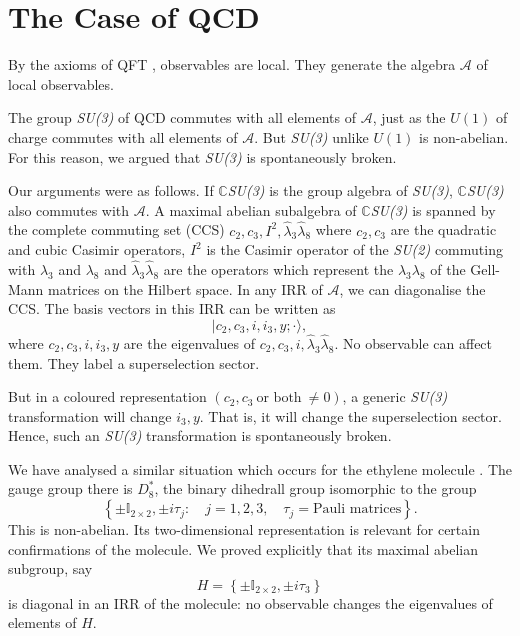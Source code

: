 \section{The Case of QCD}\label{chap4-sec3}

By the axioms of QFT \cite{chap4-key9}, observables are local. They generate the algebra $\mathcal{A}$ of local observables.

The group \textit{SU(3)} of QCD commutes with all elements of $\mathcal{A}$, just as the $U(1)$ of charge commutes with all elements of  $\mathcal{A}$. But \textit{SU(3)} unlike $U(1)$ is non-abelian. For this reason, we argued \cite{chap4-key1, chap4-key4} that \textit{SU(3)} is spontaneously broken.

Our arguments were as follows. If $\mathbb{C}$\textit{SU(3)} is the group algebra of \textit{SU(3)}, $\mathbb{C}$\textit{SU(3)} also commutes with $\mathcal{A}$. A maximal abelian subalgebra of $\mathbb{C}$\textit{SU(3)} is spanned by the complete commuting set (CCS) $c_2, c_3, I^{2}, \hat{\lambda}_3 \hat{\lambda}_8$ where $c_2, c_3$ are the quadratic and cubic Casimir operators, $I^{2}$ is the Casimir operator of the \textit{SU(2)} commuting with $\lambda_{3}$ and $\lambda_{8}$ and  $\hat{\lambda}_3 \hat{\lambda}_8$ are the operators which represent the ${\lambda}_3 {\lambda}_8$ of the Gell-Mann matrices on the Hilbert space. In any IRR of $\mathcal{A}$, we can diagonalise the CCS. The basis vectors in this IRR can be written as
\begin{equation}
  |c_2, c_3, i, i_3, y;\cdot \rangle,\label{chap4-eq3.1}
\end{equation}
where $c_2, c_3, i, i_3, y$ are the eigenvalues of $c_2, c_3, i, \hat{\lambda}_3 \hat{\lambda}_8$. No observable can affect them. They label a superselection sector.

But in a coloured representation $(c_2, c_3 ~\text{or both}~\neq 0)$, a generic \textit{SU(3)} transformation will change $i_3, y$. That is, it will change the superselection sector. Hence, such an \textit{SU(3)} transformation is spontaneously broken.

We have analysed a similar situation which occurs for the ethylene molecule \cite{chap4-key10}. The gauge group there is $D^\ast_8$, the binary dihedrall group isomorphic to the group
\begin{equation}
\left\{ \pm \mathbb{I}_{2 \times 2}, \pm i \tau_j :\quad j=1, 2, 3, \quad \tau_j = \text{Pauli matrices}\right\}.\label{chap4-eq3.2}
\end{equation}
This is non-abelian. Its two-dimensional representation is relevant for certain confirmations of the molecule. We proved explicitly that its maximal abelian subgroup, say
\begin{equation}
H = \left\{ \pm \mathbb{I}_{2 \times 2}, \pm  i \tau_3\right\}\label{chap4-eq3.3}
\end{equation}
is diagonal in an IRR of the molecule: no observable changes the eigenvalues of elements of $H$.

